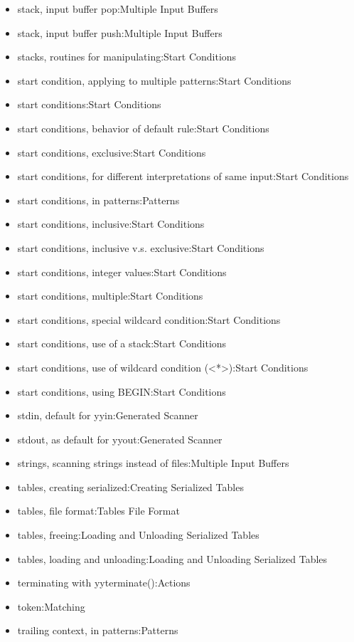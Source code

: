 \documentclass[openany,oneside]{book}
\begin{document}
\begin{itemize}
\item stack, input buffer pop:Multiple Input Buffers
\item stack, input buffer push:Multiple Input Buffers
\item stacks, routines for manipulating:Start Conditions
\item start condition, applying to multiple patterns:Start Conditions
\item start conditions:Start Conditions
\item start conditions, behavior of default rule:Start Conditions
\item start conditions, exclusive:Start Conditions
\item start conditions, for different interpretations of same input:Start Conditions
\item start conditions, in patterns:Patterns
\item start conditions, inclusive:Start Conditions
\item start conditions, inclusive v.s. exclusive:Start Conditions
\item start conditions, integer values:Start Conditions
\item start conditions, multiple:Start Conditions
\item start conditions, special wildcard condition:Start Conditions
\item start conditions, use of a stack:Start Conditions
\item start conditions, use of wildcard condition (<*>):Start Conditions
\item start conditions, using BEGIN:Start Conditions
\item stdin, default for yyin:Generated Scanner
\item stdout, as default for yyout:Generated Scanner
\item strings, scanning strings instead of files:Multiple Input Buffers
\item tables, creating serialized:Creating Serialized Tables
\item tables, file format:Tables File Format
\item tables, freeing:Loading and Unloading Serialized Tables
\item tables, loading and unloading:Loading and Unloading Serialized Tables
\item terminating with yyterminate():Actions
\item token:Matching
\item trailing context, in patterns:Patterns

\end{itemize}
\end{document}
